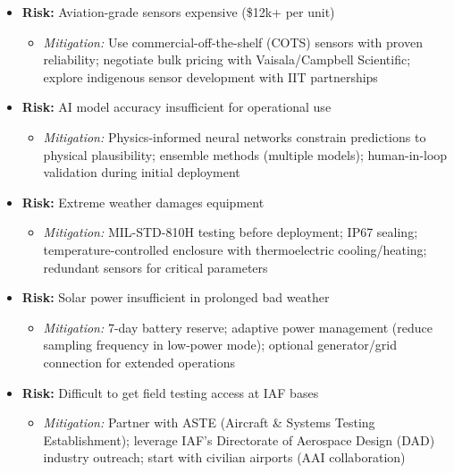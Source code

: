 \begin{itemize}
    \item \textbf{Risk:} Aviation-grade sensors expensive (\$12k+ per unit)
    \begin{itemize}
        \item \textit{Mitigation:} Use commercial-off-the-shelf (COTS) sensors with proven reliability; negotiate bulk pricing with Vaisala/Campbell Scientific; explore indigenous sensor development with IIT partnerships
    \end{itemize}
    
    \item \textbf{Risk:} AI model accuracy insufficient for operational use
    \begin{itemize}
        \item \textit{Mitigation:} Physics-informed neural networks constrain predictions to physical plausibility; ensemble methods (multiple models); human-in-loop validation during initial deployment
    \end{itemize}
    
    \item \textbf{Risk:} Extreme weather damages equipment
    \begin{itemize}
        \item \textit{Mitigation:} MIL-STD-810H testing before deployment; IP67 sealing; temperature-controlled enclosure with thermoelectric cooling/heating; redundant sensors for critical parameters
    \end{itemize}
    
    \item \textbf{Risk:} Solar power insufficient in prolonged bad weather
    \begin{itemize}
        \item \textit{Mitigation:} 7-day battery reserve; adaptive power management (reduce sampling frequency in low-power mode); optional generator/grid connection for extended operations
    \end{itemize}
    
    \item \textbf{Risk:} Difficult to get field testing access at IAF bases
    \begin{itemize}
        \item \textit{Mitigation:} Partner with ASTE (Aircraft \& Systems Testing Establishment); leverage IAF's Directorate of Aerospace Design (DAD) industry outreach; start with civilian airports (AAI collaboration)
    \end{itemize}
\end{itemize}

